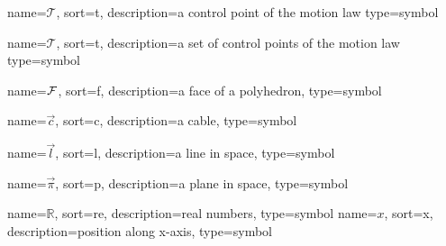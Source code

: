 
\newcommand\Tau{{T}}

	{%
		name=\ensuremath{\mathcal{T}},
		sort=t,
		description=a control point of the motion law
		type=symbol
	}
	\newcommand{\mlcontrolpoint}{\gls{sym:mlcontrolpoint}}

	{%
		name=\ensuremath{\mathscr{T}},
		sort=t,
		description=a set of control points of the motion law
		type=symbol
	}
	\newcommand{\mlcontrolpointset}{\gls{sym:mlcontrolpointset}}

	{%
		name=\ensuremath{\set{F}},
		sort=f,
		description=a face of a polyhedron,
		type=symbol
	}
	\newcommand{\face}{\gls{sym:face}}

	{%
		name=\ensuremath{\vec{c}},
		sort=c,
		description=a cable,
		type=symbol
	}
	\newcommand{\cable}{\gls{sym:cable}}

	{%
		name=\ensuremath{\vec{l}},
		sort=l,
		description=a line in space,
		type=symbol
	}
	\newcommand{\linevec}{\gls{sym:linevec}}

	{%
		name=\ensuremath{\vec{\pi}},
		sort=p,
		description=a plane in space,
		type=symbol
	}
	\newcommand{\plane}{\gls{sym:plane}}

	{%
		name=\ensuremath{\mathds{R}},
		sort=re,
		description=real numbers,
		type=symbol
	}
	\renewcommand{\Re}{\gls{sym:Re}}
	{%
		name=\ensuremath{x},
		sort=x,
		description=position along x-axis,
		type=symbol
	}
	\newcommand{\xcoord}{\gls{sym:xcoord}}

